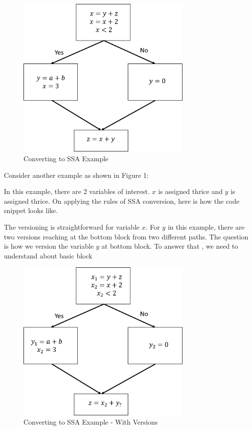 \begin{figure}
\centering
\includegraphics[height=8cm]{images/Example1.png}
\caption{Converting to SSA Example}
\end{figure}

Consider another example as shown in Figure 1:

In this example, there are 2 variables of interest. $x$ is assigned thrice and $y$ is assigned thrice. On applying the rules of SSA conversion, here is how the code snippet looks like.

The versioning is straightforward for variable $x$. For $y$ in this example, there are two versions reaching at the bottom block from two different paths. The question is how we version the variable $y$ at bottom block. To answer that , we need to understand about basic block
\begin{figure}
\centering
\includegraphics[height=8cm]{images/Example2.png}
\caption{Converting to SSA Example - With Versions}
\end{figure}

